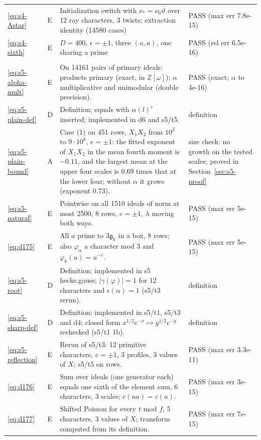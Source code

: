 \documentclass[11pt]{article}
\numberwithin{equation}{section}
\begin{document}
\begin{longtable}{@{}>{\raggedright\arraybackslash}p{1.2cm}>{\centering\arraybackslash}p{0.7cm}>{\raggedright\arraybackslash}p{9.05cm}>{\raggedright\arraybackslash}p{4.3cm}@{}}
\eqref{eq:s4-Astar} & E & Initialization switch with $\nu_*=\nu_0\overline\vartheta$ over 12 ray characters, 3 twists; extraction identity (14580 cases) & PASS (max err 7.8e-15)\\
\eqref{eq:s4-sixth} & E & $D=400$, $\epsilon=\pm1$, three $(u,a)$, one sharing a prime & PASS (rel err 6.5e-16)\\
\multicolumn{4}{@{}l}{\emph{Appendix~F}}\\
\eqref{eq:s5-alpha-mult} & E & On 14161 pairs of primary ideals: products primary (exact, in $\mathbb Z[\omega]$); $\alpha$ multiplicative and unimodular (double precision). & PASS (exact; $\alpha$ to 4e-16)\\
\eqref{eq:s5-plain-def} & D & Definition; equals \cite[eq.~(4.1)]{OAI78} with $\alpha(l)^e$ inserted; implemented in d6 and s5/t5. & definition\\
\eqref{eq:s5-plain-bound} & A & Case (1) on 451 rows, $X_1X_2$ from $10^2$ to $9\cdot10^8$, $e=\pm1$: the fitted exponent of $X_1X_2$ in the mean fourth moment is $-0.11$, and the largest mean at the upper four scales is 0.69 times that at the lower four; without $\alpha$ it grows (exponent 0.73). & size check: no growth on the tested scales; proved in Section~\ref{sec:s5-proof}\\
\eqref{eq:s5-natural} & E & Pointwise on all 1510 ideals of norm at most 2500, 8 rows, $e=\pm1$, $\lambda$ moving both ways. & PASS (max err 5e-15)\\
\eqref{eq:d175} & E & All $a$ prime to $3\mathfrak g_k$ in a box, 8 rows; also $\varphi_\alpha$ a character mod 3 and $\varphi_k(u)=u^{-e}$. & PASS (max err 5e-15)\\
\eqref{eq:s5-root} & D & Definition; implemented in s5 hecke.gauss; $|\gamma(\varphi)|=1$ for 12 characters and $\epsilon(\alpha)=1$ (s5/t3 rerun). & definition\\
\eqref{eq:s5-sharp-def} & D & Definition; implemented in s5/t1, s5/t3 and d4; closed form $x^{1/2}e^{-x}\mapsto y^{1/2}e^{-y}$ rechecked (s5/t1 1b). & definition\\
\eqref{eq:s5-reflection} & E & Rerun of s5/t3: 12 primitive characters, $e=\pm1$, 3 profiles, 3 values of $X$; s5/t5 on rows. & PASS (max err 3.3e-11)\\
\eqref{eq:d176} & E & Sum over ideals (one generator each) equals one sixth of the element sum, 6 characters, 3 scales; $c(ua)=c(a)$. & PASS (max err 3e-15)\\
\eqref{eq:d177} & E & Shifted Poisson for every $t$ mod $f$, 5 characters, 3 values of $X$; transform computed from its definition. & PASS (max err 7e-15)\\

\end{longtable}
\end{document}
